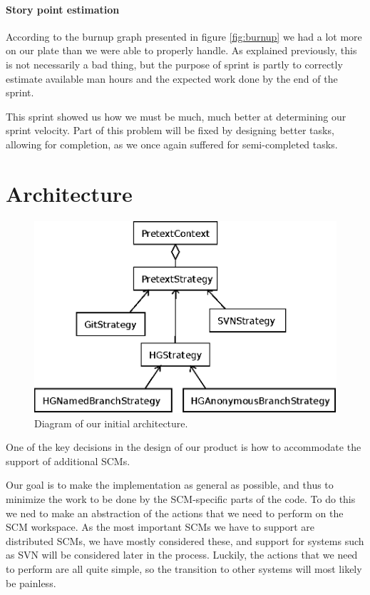 \documentclass[a4paper]{article}
\begin{document}
\paragraph{Story point estimation}
According to the burnup graph presented in figure \ref{fig:burnup} we had a lot
more on our plate than we were able to properly handle. As explained previously,
this is not necessarily a bad thing, but the purpose of sprint is partly to
correctly estimate available man hours and the expected work done by the end of
the sprint. 

This sprint showed us how we must be much, much better at determining our sprint
velocity. Part of this problem will be fixed by designing better tasks, allowing
for completion, as we once again suffered for semi-completed tasks.

\section{Architecture}
\label{sec:review}
\begin{figure}
	\centering
	\includegraphics[width=\textwidth/2]{img/uml.eps}
	\caption{Diagram of our initial architecture.}
	\label{fig:architecture}
\end{figure}

One of the key decisions in the design of our product is how to accommodate the
support of additional SCMs.

Our goal is to make the implementation as general as possible, and thus to
minimize the work to be done by the SCM-specific parts of the code.
To do this we ned to make an abstraction of the actions that we need to perform
on the SCM workspace.
As the most important SCMs we have to support are distributed SCMs, we have
mostly considered these, and support for systems such as SVN will be considered
later in the process.
Luckily, the actions that we need to perform are all quite simple, so the
transition to other systems will most likely be painless.
\end{document}

